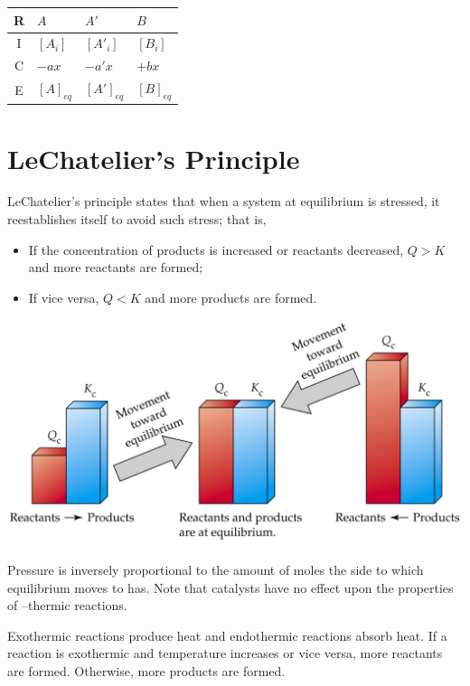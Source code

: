 \documentclass{tufte-book}
\begin{document}
\begin{center}
  \begin{tabular}{clll}
    R & $A$ & $A'$ & $B$ \\
    \hline
    I & $[A_i]$ & $[A'_i]$ & $[B_i]$ \\
    C & $-ax$ & $-a'x$ &  $+bx$ \\
    E & $[A]_{eq}$ & $[A']_{eq}$ & $[B]_{eq}$
  \end{tabular}
\end{center}

\section{LeChatelier's Principle}

LeChatelier's principle states that when a system at equilibrium is stressed, it reestablishes itself to avoid such stress; that is,
\begin{itemize}
  \item If the concentration of products is increased or reactants decreased, $Q>K$ and more reactants are formed;
  \item If vice versa, $Q<K$ and more products are formed.
\end{itemize}
%
\begin{marginfigure}[5mm]
\begin{center}
  \includegraphics[width=\textwidth]{qk}
\end{center}
\end{marginfigure}
%
Pressure is inversely proportional to the amount of moles the side to which equilibrium moves to has. Note that catalysts have no effect upon the properties of --thermic reactions.

\bigskip
Exothermic reactions produce heat and endothermic reactions absorb heat. If a reaction is exothermic and temperature increases or vice versa, more reactants are formed. Otherwise, more products are formed.
\end{document}
